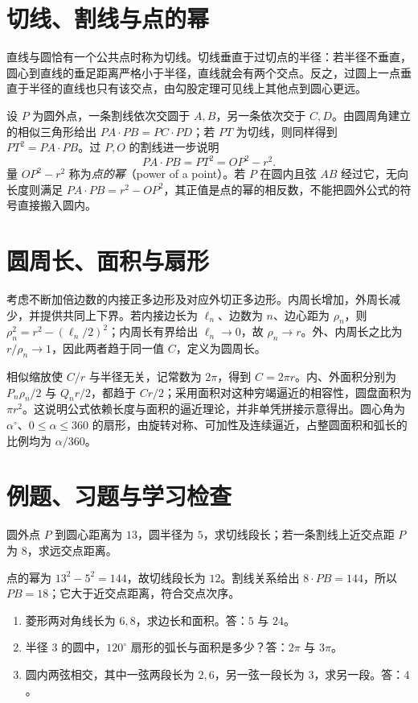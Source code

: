 \section{切线、割线与点的幂}
直线与圆恰有一个公共点时称为切线。切线垂直于过切点的半径：若半径不垂直，圆心到直线的垂足距离严格小于半径，直线就会有两个交点。反之，过圆上一点垂直于半径的直线也只有该交点，由勾股定理可见线上其他点到圆心更远。

设 $P$ 为圆外点，一条割线依次交圆于 $A,B$，另一条依次交于 $C,D$。由圆周角建立的相似三角形给出 $PA\cdot PB=PC\cdot PD$；若 $PT$ 为切线，则同样得到 $PT^2=PA\cdot PB$。过 $P,O$ 的割线进一步说明
\[
 PA\cdot PB=PT^2=OP^2-r^2.
\]
量 $OP^2-r^2$ 称为\emph{点的幂}（power of a point）。若 $P$ 在圆内且弦 $AB$ 经过它，无向长度则满足 $PA\cdot PB=r^2-OP^2$，其正值是点的幂的相反数，不能把圆外公式的符号直接搬入圆内。

\section{圆周长、面积与扇形}
考虑不断加倍边数的内接正多边形及对应外切正多边形。内周长增加，外周长减少，并提供共同上下界。若内接边长为 $\ell_n$、边数为 $n$、边心距为 $\rho_n$，则 $\rho_n^2=r^2-(\ell_n/2)^2$；内周长有界给出 $\ell_n\to0$，故 $\rho_n\to r$。外、内周长之比为 $r/\rho_n\to1$，因此两者趋于同一值 $C$，定义为圆周长。

相似缩放使 $C/r$ 与半径无关，记常数为 $2\pi$，得到 $C=2\pi r$。内、外面积分别为 $P_n\rho_n/2$ 与 $Q_nr/2$，都趋于 $Cr/2$；采用面积对这种穷竭逼近的相容性，圆盘面积为 $\pi r^2$。这说明公式依赖长度与面积的逼近理论，并非单凭拼接示意得出。圆心角为 $\alpha^\circ$、$0\le\alpha\le360$ 的扇形，由旋转对称、可加性及连续逼近，占整圆面积和弧长的比例均为 $\alpha/360$。

\section{例题、习题与学习检查}
\begin{example}
圆外点 $P$ 到圆心距离为 $13$，圆半径为 $5$，求切线段长；若一条割线上近交点距 $P$ 为 $8$，求远交点距离。
\end{example}
\begin{solve}
点的幂为 $13^2-5^2=144$，故切线段长为 $12$。割线关系给出 $8\cdot PB=144$，所以 $PB=18$；它大于近交点距离，符合交点次序。
\end{solve}
\begin{enumerate}
\item 菱形两对角线长为 $6,8$，求边长和面积。答：$5$ 与 $24$。
\item 半径 $3$ 的圆中，$120^\circ$ 扇形的弧长与面积是多少？答：$2\pi$ 与 $3\pi$。
\item 圆内两弦相交，其中一弦两段长为 $2,6$，另一弦一段长为 $3$，求另一段。答：$4$。
\end{enumerate}

